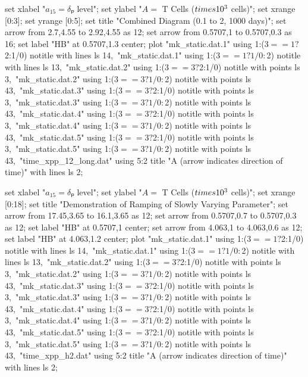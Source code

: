   set xlabel "$a_{15} = δₚ$ level";
  set ylabel "$A = $ T Cells ($\\times 10^3$ cells)";
  set xrange [0:3];
  set yrange [0:5];
  set title "Combined Diagram (0.1 to 2, 1000 days)";
  set arrow from 2.7,4.55 to 2.92,4.55 as 12;
  set arrow from 0.5707,1 to 0.5707,0.3 as 16;
  set label "HB" at 0.5707,1.3 center;
  plot "mk_static.dat.1" using 1:($3==1?$2:1/0) notitle with lines ls 14,\
       "mk_static.dat.1" using 1:($3==1?1/0:$2) notitle with lines ls 13,\
       "mk_static.dat.2" using 1:($3==3?$2:1/0) notitle with points ls 3,\
       "mk_static.dat.2" using 1:($3==3?1/0:$2) notitle with points ls 43,\
       "mk_static.dat.3" using 1:($3==3?$2:1/0) notitle with points ls 3,\
       "mk_static.dat.3" using 1:($3==3?1/0:$2) notitle with points ls 43,\
       "mk_static.dat.4" using 1:($3==3?$2:1/0) notitle with points ls 3,\
       "mk_static.dat.4" using 1:($3==3?1/0:$2) notitle with points ls 43,\
       "mk_static.dat.5" using 1:($3==3?$2:1/0) notitle with points ls 3,\
       "mk_static.dat.5" using 1:($3==3?1/0:$2) notitle with points ls 43,\
       "time_xpp_12_long.dat" using 5:2 title "A (arrow indicates direction of time)" with lines ls 2;
\stopGNUPLOTscript

\startGNUPLOTscript[bifurcation_combined_h2]
  set xlabel "$a_{15} = δₚ$ level";
  set ylabel "$A = $ T Cells ($\\times 10^3$ cells)";
  set xrange [0:18];
  set title "Demonstration of Ramping of Slowly Varying Parameter";
  set arrow from 17.45,3.65 to 16.1,3.65 as 12;
  set arrow from 0.5707,0.7 to 0.5707,0.3 as 12;
  set label "HB" at 0.5707,1 center;
  set arrow from 4.063,1 to 4.063,0.6 as 12;
  set label "HB" at 4.063,1.2 center;
  plot "mk_static.dat.1" using 1:($3==1?$2:1/0) notitle with lines ls 14,\
       "mk_static.dat.1" using 1:($3==1?1/0:$2) notitle with lines ls 13,\
       "mk_static.dat.2" using 1:($3==3?$2:1/0) notitle with points ls 3,\
       "mk_static.dat.2" using 1:($3==3?1/0:$2) notitle with points ls 43,\
       "mk_static.dat.3" using 1:($3==3?$2:1/0) notitle with points ls 3,\
       "mk_static.dat.3" using 1:($3==3?1/0:$2) notitle with points ls 43,\
       "mk_static.dat.4" using 1:($3==3?$2:1/0) notitle with points ls 3,\
       "mk_static.dat.4" using 1:($3==3?1/0:$2) notitle with points ls 43,\
       "mk_static.dat.5" using 1:($3==3?$2:1/0) notitle with points ls 3,\
       "mk_static.dat.5" using 1:($3==3?1/0:$2) notitle with points ls 43,\
       "time_xpp_h2.dat" using 5:2 title "A (arrow indicates direction of time)" with lines ls 2;
\stopGNUPLOTscript

